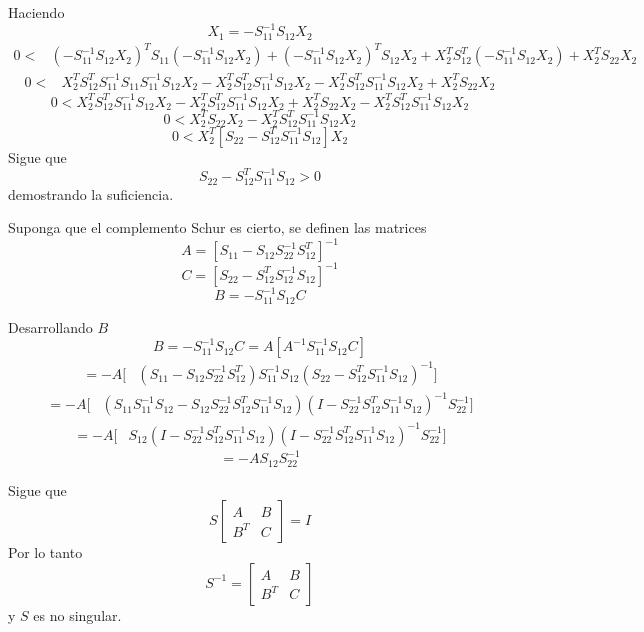 Haciendo
\[
  X_1=-S_{11}^{-1}S_{12}X_2
\]
\begin{align*}
  0<{}&(-S_{11}^{-1}S_{12}X_2)^{T}
  S_{11}(-S_{11}^{-1}S_{12}X_2)
  +(-S_{11}^{-1}S_{12}X_2)^{T}S_{12}X_2
  +X_2^{T}S_{12}^{T}(-S_{11}^{-1}S_{12}X_2)
  +X_2^{T}S_{22}X_2
\end{align*}
\begin{align*}
  0<{}&X_2^{T}S_{12}^{T}S_{11}^{-1}S_{11}S_{11}^{-1}S_{12}X_2
  -X_2^{T}S_{12}^{T}S_{11}^{-1}S_{12}X_2
  -X_2^{T}S_{12}^{T}S_{11}^{-1}S_{12}X_2
  +X_2^{T}S_{22}X_2
\end{align*}
\[
  0<X_2^{T}S_{12}^{T}S_{11}^{-1}S_{12}X_2
  -X_2^{T}S_{12}^{T}S_{11}^{-1}S_{12}X_2
  +X_2^{T}S_{22}X_2
  -X_2^{T}S_{12}^{T}S_{11}^{-1}S_{12}X_2
\]
\[
  0<X_2^{T}S_{22}X_2
  -X_2^{T}S_{12}^{T}S_{11}^{-1}S_{12}X_2
\]
\[
  0<X_2^{T}
  [S_{22}-S_{12}^{T}S_{11}^{-1}S_{12}]X_2
\]
Sigue que
\[
  S_{22}-S_{12}^{T}S_{11}^{-1}S_{12}>0
\]
demostrando la suficiencia.

Suponga que el complemento Schur es cierto, se definen las matrices
\[
  A=[S_{11}-S_{12}S_{22}^{-1}S_{12}^{T}]^{-1}
\]
\[
  C=[S_{22}-S_{12}^{T}S_{12}^{-1}S_{12}]^{-1}
\]
\[
  B=-S_{11}^{-1}S_{12}C
\]

Desarrollando $B$
\[
  B=-S_{11}^{-1}S_{12}C
  =A[A^{-1}S_{11}^{-1}S_{12}C]
\]
\begin{align*}
  =-A[{}&(S_{11}-S_{12}S_{22}^{-1}S_{12}^{T})
  S_{11}^{-1}S_{12}
  (S_{22}-S_{12}^{T}S_{11}^{-1}S_{12})^{-1}]
\end{align*}
\begin{align*}
  =-A[{}&(S_{11}S_{11}^{-1}S_{12}
  -S_{12}S_{22}^{-1}S_{12}^{T}S_{11}^{-1}S_{12})
  (I-S_{22}^{-1}S_{12}^{T}S_{11}^{-1}S_{12})^{-1}
  S_{22}^{-1}]
\end{align*}
\begin{align*}
  =-A[{}&S_{12}(I-S_{22}^{-1}S_{12}^{T}S_{11}^{-1}S_{12})
  (I-S_{22}^{-1}S_{12}^{T}S_{11}^{-1}S_{12})^{-1}
  S_{22}^{-1}]
\end{align*}
\[
  =-AS_{12}S_{22}^{-1}
\]

Sigue que
\[
  S
  \begin{bmatrix}
    A & B\\
    B^{T} & C
  \end{bmatrix}
  =I
\]
Por lo tanto
\[
  S^{-1}=
  \begin{bmatrix}
    A & B\\
    B^{T} & C
  \end{bmatrix}
\]
y $S$ es no singular.